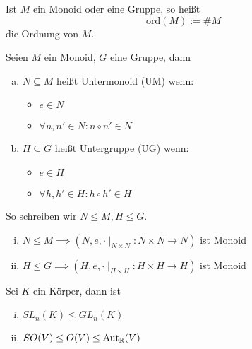 \documentclass[a4paper]{report}
\begin{document}
\begin{defi}
  Ist $M$ ein Monoid oder eine Gruppe, so heißt $$\mathrm{ord}(M):=\#M$$
  die Ordnung von $M$.
\end{defi}

\begin{defi}
  Seien $M$ ein Monoid, $G$ eine Gruppe, dann
  \begin{enumerate}[(a)] %
    \item $N \subseteq M$ heißt Untermonoid (UM) wenn:
          \begin{itemize}
            \item $e \in N$
            \item $\forall n, n' \in N : n \circ n' \in N$
          \end{itemize}
    \item $H \subseteq G$ heißt Untergruppe (UG) wenn:
          \begin{itemize}
            \item $e \in H$
            \item $\forall h, h' \in H : h \circ h' \in H$
          \end{itemize}
  \end{enumerate}

So schreiben wir $N \leq M, H \leq G$.
\end{defi}

\begin{ubng}%
  \begin{enumerate}[(i)] %
    \item $N \leq M \implies (N, e, \cdot \mid_{N \times N}:N\times N \to N)$ ist Monoid
    \item $H \leq G \implies (H, e, \cdot \mid_{H \times H}:H\times H \to H)$ ist Monoid
  \end{enumerate}

\end{ubng}
\begin{bsp*}
  Sei $K$ ein Körper, dann ist
  \begin{enumerate}[(i)] %
    \item $SL_{n}(K) \leq GL_{n}(K)$
    \item $SO(V) \leq O(V) \le \mathrm{Aut}_{\Bbb R}(V)$
  \end{enumerate}
\end{bsp*}
\end{document}
